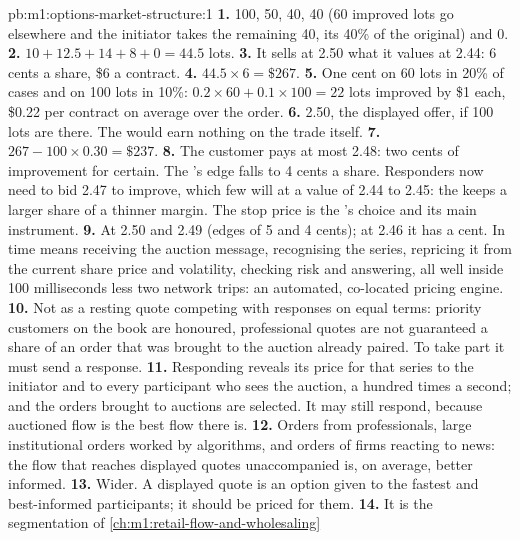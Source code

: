 \begin{solution}{pb:m1:options-market-structure:1}
\textbf{1.} 100, 50, 40, 40 (60 improved lots go elsewhere and the initiator
takes the remaining 40, its 40\% of the original) and 0.
\textbf{2.} $10 + 12.5 + 14 + 8 + 0 = 44.5$ lots.
\textbf{3.} It sells at 2.50 what it values at 2.44: 6 cents a share, \$6 a
contract.
\textbf{4.} $44.5 \times 6 = \$267$.
\textbf{5.} One cent on 60 lots in 20\% of cases and on 100 lots in 10\%:
$0.2 \times 60 + 0.1 \times 100 = 22$ lots improved by \$1 each, \$0.22 per
contract on average over the order.
\textbf{6.} 2.50, the displayed offer, if 100 lots are there. The 
would earn nothing on the trade itself.
\textbf{7.} $267 - 100 \times 0.30 = \$237$.
\textbf{8.} The customer pays at most 2.48: two cents of improvement for
certain. The 's edge falls to 4 cents a share. Responders now need
to bid 2.47 to improve, which few will at a value of 2.44 to 2.45: the
 keeps a larger share of a thinner margin. The stop price is the
's choice and its main instrument.
\textbf{9.} At 2.50 and 2.49 (edges of 5 and 4 cents); at 2.46 it has a cent.
In time means receiving the auction message, recognising the series,
repricing it from the current share price and volatility, checking risk and
answering, all well inside 100 milliseconds less two network trips: an
automated, co-located pricing engine.
\textbf{10.} Not as a resting quote competing with responses on equal terms:
priority customers on the book are honoured, professional quotes are not
guaranteed a share of an order that was brought to the auction already
paired. To take part it must send a response.
\textbf{11.} Responding reveals its price for that series to the initiator
and to every participant who sees the auction, a hundred times a second; and
the orders brought to auctions are selected. It may still respond, because
auctioned flow is the best flow there is.
\textbf{12.} Orders from professionals, large institutional orders worked by
algorithms, and orders of firms reacting to news: the flow that reaches
displayed quotes unaccompanied is, on average, better informed.
\textbf{13.} Wider. A displayed quote is an option given to the fastest and
best-informed participants; it should be priced for them.
\textbf{14.} It is the segmentation of \cref{ch:m1:retail-flow-and-wholesaling}

\end{solution}
